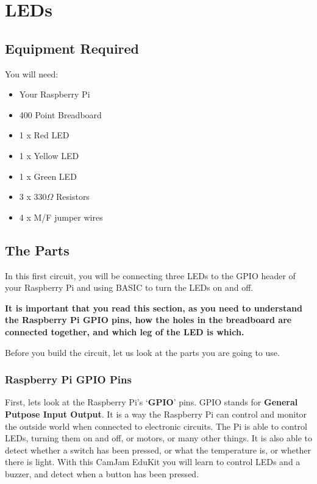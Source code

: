 \section{LEDs}\label{s:leds}


\subsection*{Equipment Required}

You will need:
\begin{itemize}
\item Your Raspberry Pi
\item 400 Point Breadboard
\item 1 x Red LED
\item 1 x Yellow LED
\item 1 x Green LED
\item 3 x 330$\Omega$ Resistors
\item 4 x M/F jumper wires
\end{itemize}

\subsection*{The Parts}

In this first circuit, you will be connecting three LEDs to the GPIO header of your Raspberry Pi and using BASIC to turn the LEDs on and off.

\textbf{It is important that you read this section, as you need to understand the Raspberry Pi GPIO pins, how the holes in the breadboard are connected together, and which leg of the LED is which.}

Before you build the circuit, let us look at the parts you are going to use.

\subsubsection*{Raspberry Pi GPIO Pins}


First, lets look at the Raspberry Pi's `\textbf{GPIO}' pins.  GPIO stands for \textbf{General Putpose Input Output}.  It is a way the Raspberry Pi can control and monitor the outside world when connected to electronic circuits.  The Pi is able to control LEDs, turning them on and off, or motors, or many other things.  It is also able to detect whether a switch has been pressed, or what the temperature is, or whether there is light.  With this CamJam EduKit you will learn to control LEDs and a buzzer, and detect when a button has been pressed.


